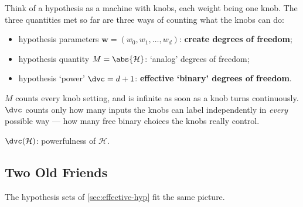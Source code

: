 Think of a hypothesis as a machine with knobs, each weight being one knob. The
three quantities met so far are three ways of counting what the knobs can do:

\begin{itemize}
    \item hypothesis parameters \(\bm{w} = (w_0, w_1, \dots , w_d)\):
        \textbf{create degrees of freedom};
    \item hypothesis quantity \(M = \abs{\mathcal{H}}\): `analog' degrees of
        freedom;
    \item hypothesis `power' \(\dvc = d + 1\): \textbf{effective `binary'
        degrees of freedom}.
\end{itemize}

\(M\) counts every knob setting, and is infinite as soon as a knob turns
continuously. \(\dvc\) counts only how many inputs the knobs can label
independently in \emph{every} possible way --- how many free binary choices
the knobs really control.

\begin{moral}
    \(\dvc(\mathcal{H})\): powerfulness of \(\mathcal{H}\).
\end{moral}

\subsection{Two Old Friends}

The hypothesis sets of \autoref{sec:effective-hyp} fit the same picture.

